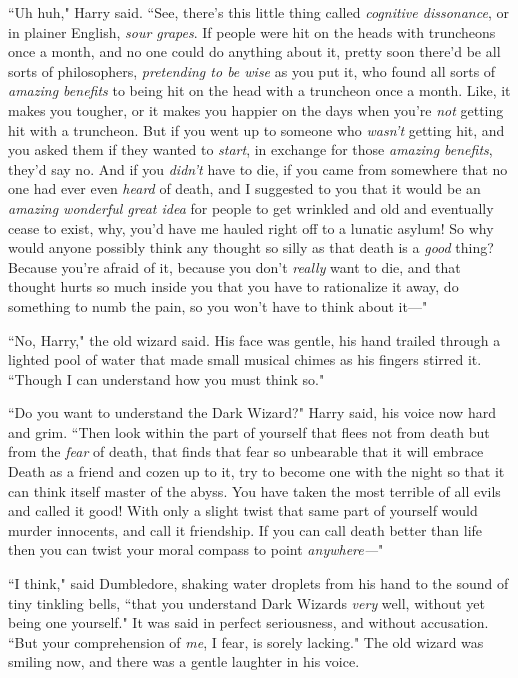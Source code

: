 ``Uh huh," Harry said. ``See, there's this little thing called \emph{cognitive dissonance}, or in plainer English, \emph{sour grapes}. If people were hit on the heads with truncheons once a month, and no one could do anything about it, pretty soon there'd be all sorts of philosophers, \emph{pretending to be wise} as you put it, who found all sorts of \emph{amazing benefits} to being hit on the head with a truncheon once a month. Like, it makes you tougher, or it makes you happier on the days when you're \emph{not} getting hit with a truncheon. But if you went up to someone who \emph{wasn't} getting hit, and you asked them if they wanted to \emph{start}, in exchange for those \emph{amazing benefits}, they'd say no. And if you \emph{didn't} have to die, if you came from somewhere that no one had ever even \emph{heard} of death, and I suggested to you that it would be an \emph{amazing wonderful great idea} for people to get wrinkled and old and eventually cease to exist, why, you'd have me hauled right off to a lunatic asylum! So why would anyone possibly think any thought so silly as that death is a \emph{good} thing? Because you're afraid of it, because you don't \emph{really} want to die, and that thought hurts so much inside you that you have to rationalize it away, do something to numb the pain, so you won't have to think about it—"

``No, Harry," the old wizard said. His face was gentle, his hand trailed through a lighted pool of water that made small musical chimes as his fingers stirred it. ``Though I can understand how you must think so."

``Do you want to understand the Dark Wizard?" Harry said, his voice now hard and grim. ``Then look within the part of yourself that flees not from death but from the \emph{fear} of death, that finds that fear so unbearable that it will embrace Death as a friend and cozen up to it, try to become one with the night so that it can think itself master of the abyss. You have taken the most terrible of all evils and called it good! With only a slight twist that same part of yourself would murder innocents, and call it friendship. If you can call death better than life then you can twist your moral compass to point \emph{anywhere—}"

``I think," said Dumbledore, shaking water droplets from his hand to the sound of tiny tinkling bells, ``that you understand Dark Wizards \emph{very} well, without yet being one yourself." It was said in perfect seriousness, and without accusation. ``But your comprehension of \emph{me}, I fear, is sorely lacking." The old wizard was smiling now, and there was a gentle laughter in his voice.

